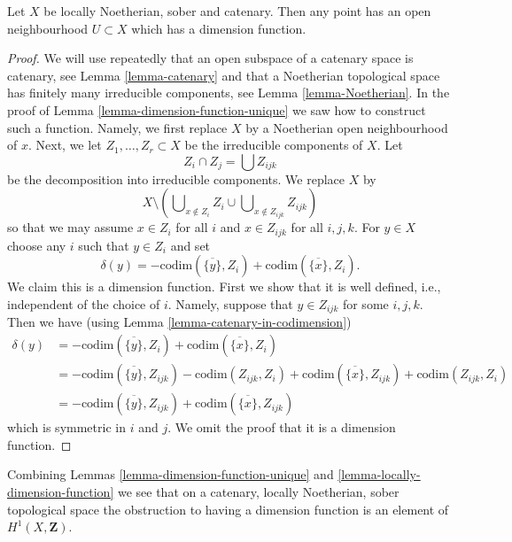 \begin{lemma}
\label{lemma-locally-dimension-function}
Let $X$ be locally Noetherian, sober and catenary.
Then any point has an open neighbourhood
$U \subset X$ which has a dimension function.
\end{lemma}

\begin{proof}
We will use repeatedly
that an open subspace of a catenary space is catenary, see
Lemma \ref{lemma-catenary} and that a Noetherian topological space
has finitely many irreducible components, see Lemma \ref{lemma-Noetherian}.
In the proof of Lemma \ref{lemma-dimension-function-unique} we saw how to
construct such a function. Namely, we first replace $X$ by a Noetherian
open neighbourhood of $x$. Next, we let $Z_1, \ldots, Z_r \subset X$
be the irreducible components of $X$. Let
$$
Z_i \cap Z_j = \bigcup Z_{ijk}
$$
be the decomposition into irreducible components. We replace
$X$ by
$$
X \setminus \left(
\bigcup\nolimits_{x \not \in Z_i} Z_i
\cup
\bigcup\nolimits_{x \not \in Z_{ijk}} Z_{ijk}
\right)
$$
so that we may assume $x \in Z_i$ for all $i$ and
$x \in Z_{ijk}$ for all $i, j, k$. For $y \in X$ choose any
$i$ such that $y \in Z_i$ and set
$$
\delta(y) = - \text{codim}(\overline{\{y\}}, Z_i)
+ \text{codim}(\overline{\{x\}}, Z_i).
$$
We claim this is a dimension function. First we show that it
is well defined, i.e., independent of the choice of $i$.
Namely, suppose that $y \in Z_{ijk}$ for some $i, j, k$.
Then we have (using Lemma \ref{lemma-catenary-in-codimension})
\begin{align*}
\delta(y) & =
- \text{codim}(\overline{\{y\}}, Z_i)
+ \text{codim}(\overline{\{x\}}, Z_i) \\
& =
- \text{codim}(\overline{\{y\}}, Z_{ijk})
- \text{codim}(Z_{ijk}, Z_i)
+ \text{codim}(\overline{\{x\}}, Z_{ijk})
+ \text{codim}(Z_{ijk}, Z_i) \\
& =
- \text{codim}(\overline{\{y\}}, Z_{ijk})
+ \text{codim}(\overline{\{x\}}, Z_{ijk})
\end{align*}
which is symmetric in $i$ and $j$.
We omit the proof that it is a dimension function.
\end{proof}

\begin{remark}
\label{remark-obstruction-to-dimension-function}
Combining Lemmas \ref{lemma-dimension-function-unique} and
\ref{lemma-locally-dimension-function} we see that on a catenary,
locally Noetherian, sober topological space the obstruction to
having a dimension function is an element of
$H^1(X, \mathbf{Z})$.
\end{remark}



